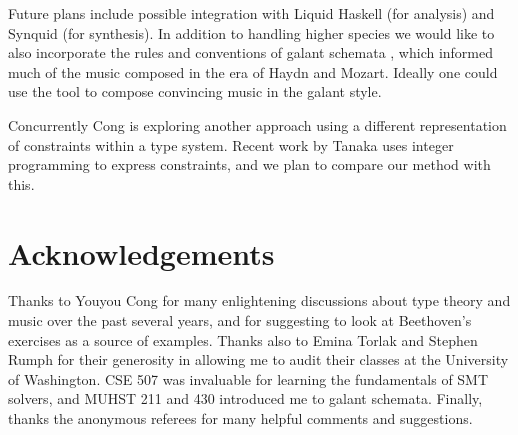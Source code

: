 \documentclass[sigplan,screen]{acmart}
\begin{document}
Future plans include possible integration with Liquid Haskell
\citep{LiquidHaskell} (for analysis) and Synquid \citep{Synquid} (for
synthesis). In addition to handling higher species we would like to
also incorporate the rules and conventions of galant schemata
\citep{Gjerdingen2007}, which informed much of the music composed in
the era of Haydn and Mozart. Ideally one could use the tool to compose
convincing music in the galant style.

Concurrently Cong \citep{Cong2022a,Cong2022c} is exploring another approach
using a different representation of constraints within a type system.
Recent work by Tanaka \citep{Tanaka2022} uses integer programming to
express constraints, and we plan to compare our method with this.

\section*{Acknowledgements}

Thanks to Youyou Cong for many enlightening discussions about type
theory and music over the past several years, and for suggesting to
look at Beethoven's exercises as a source of examples. Thanks also to
Emina Torlak and Stephen Rumph for their generosity in allowing me to
audit their classes at the University of Washington. CSE 507 was
invaluable for learning the fundamentals of SMT 
solvers, and MUHST 211 and 430 introduced me to galant schemata.
Finally, thanks the anonymous referees for many helpful comments and
suggestions.


\end{document}
